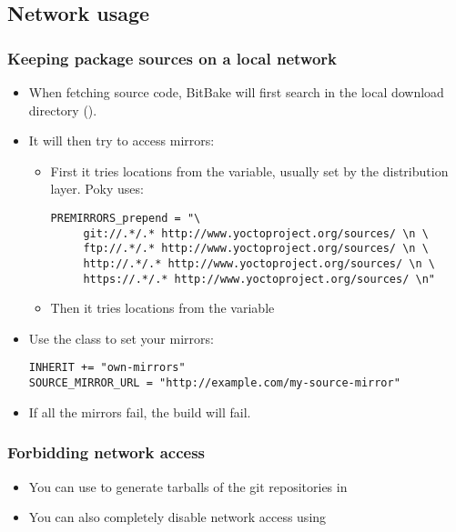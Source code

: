 \subsection{Network usage}

\begin{frame}[fragile]
  \frametitle{Keeping package sources on a local network}
  \begin{itemize}
    \item When fetching source code, BitBake will first search in the
      local download directory ().
    \item It will then try to access mirrors:
      \begin{itemize}
        \item First it tries locations from the  variable,
          usually set by the distribution layer. Poky uses:
          \begin{block}{}
            \begin{verbatim}
PREMIRRORS_prepend = "\
     git://.*/.* http://www.yoctoproject.org/sources/ \n \
     ftp://.*/.* http://www.yoctoproject.org/sources/ \n \
     http://.*/.* http://www.yoctoproject.org/sources/ \n \
     https://.*/.* http://www.yoctoproject.org/sources/ \n"
            \end{verbatim}
          \end{block}
        \item Then it tries locations from the  variable
      \end{itemize}
    \item Use the  class to set your mirrors:
          \begin{block}{}
            \begin{verbatim}
INHERIT += "own-mirrors"
SOURCE_MIRROR_URL = "http://example.com/my-source-mirror"
            \end{verbatim}
          \end{block}
    \item If all the mirrors fail, the build will fail.
  \end{itemize}
\end{frame}

\begin{frame}[fragile]
  \frametitle{Forbidding network access}
  \begin{itemize}
    \item You can use  to
      generate tarballs of the git repositories in 
    \item You can also completely disable network access using
  \end{itemize}
\end{frame}
